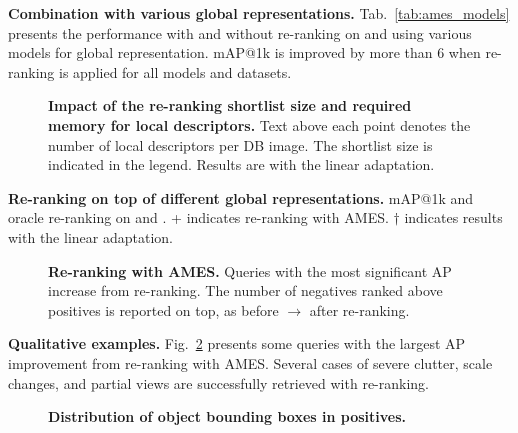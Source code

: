 \noindent\textbf{Combination with various global representations.}
Tab.~\ref{tab:ames_models} presents the performance with and without re-ranking on \ours and \miniours using various models for global representation. mAP@1k is improved by more than 6 when re-ranking is applied for all models and datasets.

\begin{figure}[t]
    \centering
    
    \vspace{-7pt}
    \caption{\textbf{Impact of the re-ranking shortlist size and required memory for local descriptors.} Text above each point denotes the number of local descriptors per DB image. The shortlist size is indicated in the legend. Results are with the linear adaptation.
    \label{fig:ames_num_desc}
    \vspace{-7pt}
    }
\end{figure}

\begin{table}[t]

  \centering
  
  \vspace{-7pt}
  \caption{\textbf{Re-ranking on top of different global representations.} mAP@1k and oracle re-ranking on \ours and \miniours. + indicates re-ranking with AMES. $\dagger$ indicates results with the linear adaptation.
  \label{tab:ames_models}
  \vspace{-7pt}
  }
\end{table}

\begin{figure}[t]
  \centering
  \vspace{10pt}
  
  \vspace{-15pt}
  \caption{\textbf{Re-ranking with AMES.} Queries with the most significant AP increase from re-ranking. The number of negatives ranked above positives is reported on top, as before $\rightarrow$ after re-ranking.
  \label{fig:ames_rerank}
  }
\end{figure}

\noindent\textbf{Qualitative examples.} Fig.~\ref{fig:ames_rerank} presents some queries with the largest AP improvement from re-ranking with AMES. Several cases of severe clutter, scale changes, and partial views are successfully retrieved with re-ranking.


\begin{figure}[t]
  \centering
  \scalebox{0.55}{
    
  }
  \caption{\textbf{Distribution of object bounding boxes in positives.}
  \label{fig:heatmap_spatial_location}
  \vspace{-10pt}
  }
\end{figure}

